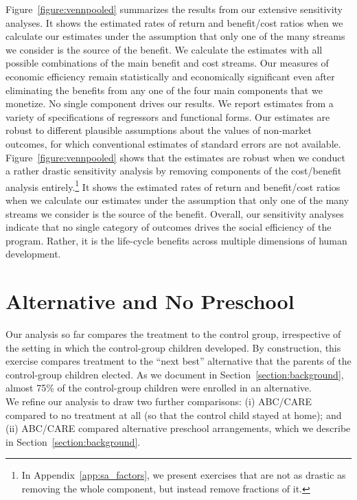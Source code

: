 \noindent Figure~\ref{figure:vennpooled} summarizes the results from our extensive sensitivity analyses. It shows the estimated rates of return and benefit/cost ratios when we calculate our estimates under the assumption that only one of the many streams we consider is the source of the benefit. We calculate the estimates with all possible combinations of the main benefit and cost streams. Our measures of economic efficiency remain statistically and economically significant even after eliminating the benefits from any one of the four main components that we monetize. No single component drives our results. We report estimates from a variety of specifications of regressors and functional forms. Our estimates are robust to different plausible assumptions about the values of non-market outcomes, for which conventional estimates of standard errors are not available.\\

\noindent Figure~\ref{figure:vennpooled} shows that the estimates are robust when we conduct a rather drastic sensitivity analysis by removing components of the cost/benefit analysis entirely.\footnote{In  Appendix~\ref{app:sa_factors}, we present exercises that are not as drastic as removing the whole component, but instead remove fractions of it.} It shows the estimated rates of return and benefit/cost ratios when we calculate our estimates under the assumption that only one of the many streams we consider is the source of the benefit. Overall, our sensitivity analyses indicate that no single category of outcomes drives the social efficiency of the program. Rather, it is the life-cycle benefits across multiple dimensions of human development.

\section{Alternative and No Preschool} \label{section:cbaresultscont}

Our analysis so far compares the treatment to the control group, irrespective of the setting in which the control-group children developed. By construction, this exercise compares treatment to the ``next best'' alternative that the parents of the control-group children elected. As we document in Section~\ref{section:background}, almost 75\% of the control-group children were enrolled in an alternative.\\

\noindent We refine our analysis to draw two further comparisons: (i) ABC/CARE compared to no treatment at all (so that the control child stayed at home); and (ii) ABC/CARE compared alternative preschool arrangements, which we describe in Section~\ref{section:background}.\\ 


